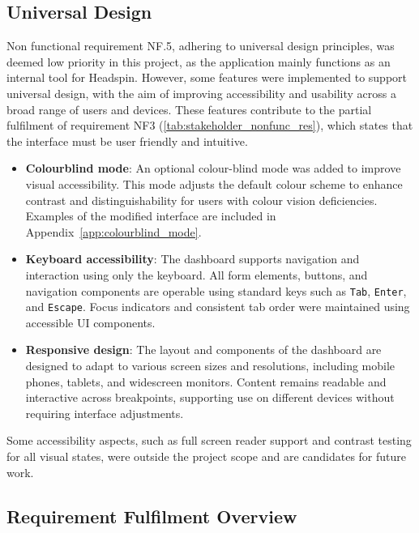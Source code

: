 \subsection{Universal Design}
\label{sec:universal_design}

Non functional requirement NF.5, adhering to universal design principles, was deemed low priority in this project, as the application mainly functions as an internal tool for Headspin. However, some features were implemented to support universal design, with the aim of improving accessibility and usability across a broad range of users and devices. These features contribute to the partial fulfilment of requirement NF3 (\autoref{tab:stakeholder_nonfunc_res}), which states that the interface must be user friendly and intuitive. 

\begin{itemize}
    \item \textbf{Colourblind mode}: An optional colour-blind mode was added to improve visual accessibility. This mode adjusts the default colour scheme to enhance contrast and distinguishability for users with colour vision deficiencies. Examples of the modified interface are included in Appendix~\ref{app:colourblind_mode}.

    \item \textbf{Keyboard accessibility}: The dashboard supports navigation and interaction using only the keyboard. All form elements, buttons, and navigation components are operable using standard keys such as \texttt{Tab}, \texttt{Enter}, and \texttt{Escape}. Focus indicators and consistent tab order were maintained using accessible UI components.

    \item \textbf{Responsive design}: The layout and components of the dashboard are designed to adapt to various screen sizes and resolutions, including mobile phones, tablets, and widescreen monitors. Content remains readable and interactive across breakpoints, supporting use on different devices without requiring interface adjustments.
\end{itemize}

Some accessibility aspects, such as full screen reader support and contrast testing for all visual states, were outside the project scope and are candidates for future work.



\subsection{Requirement Fulfilment Overview}
\label{subsec:req_final}

